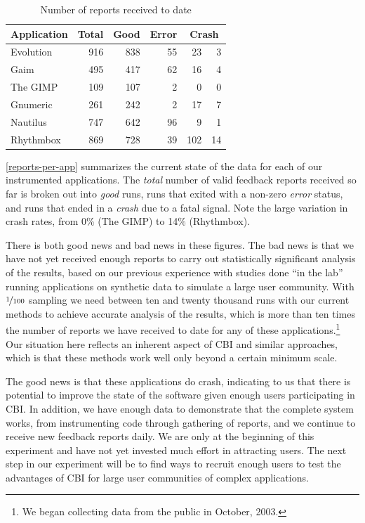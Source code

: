 \documentclass[10pt,twocolumn]{article}
\newcommand{\evolution}{Evolution\xspace}
\newcommand{\gaim}{Gaim\xspace}
\newcommand{\gimp}{The GIMP\xspace}
\newcommand{\gnumeric}{Gnumeric\xspace}
\newcommand{\nautilus}{Nautilus\xspace}
\newcommand{\rhythmbox}{Rhythmbox\xspace}
\newcommand{\header}[1]{\multicolumn{1}{c}{\textbf{#1}}}
\begin{document}
\begin{table}
  \centering
  \begin{tabular}{lrrrr@{~(}r@{\%)}}
    \header{Application} & \header{Total} & \header{Good} & \header{Error} & \multicolumn{2}{c}{\textbf{Crash}} \\ \hline
    \evolution & 916 & 838 & 55 & 23 & 3 \\
    \gaim & 495 & 417 & 62 & 16 & 4 \\
    \gimp & 109 & 107 & 2 & 0 & 0 \\
    \gnumeric & 261 & 242 & 2 & 17 & 7 \\
    \nautilus & 747 & 642 & 96 & 9 & 1 \\
    \rhythmbox & 869 & 728 & 39 & 102 & 14
  \end{tabular}
  \caption{Number of reports received to date}
  \label{reports-per-app}
\end{table}

\autoref{reports-per-app} summarizes the current state of the data for
each of our instrumented applications.  The \emph{total} number of
valid feedback reports received so far is broken out into \emph{good}
runs, runs that exited with a non-zero \emph{error} status, and runs
that ended in a \emph{crash} due to a fatal signal.  Note the large
variation in crash rates, from 0\% (\gimp) to 14\% (\rhythmbox).

There is both good news and bad news in these figures.  The bad news
is that we have not yet received enough reports to carry out
statistically significant analysis of the results, based on our
previous experience with studies done ``in the lab'' running
applications on synthetic data to simulate a large user community.
With $\nicefrac{1}{100}$ sampling we need between ten and twenty
thousand runs with our current methods to achieve accurate analysis of
the results, which is more than ten times the number of reports we
have received to date for any of these applications.\footnote{We began
  collecting data from the public in October, 2003.}  Our situation
here reflects an inherent aspect of CBI and similar approaches, which
is that these methods work well only beyond a certain minimum scale.

The good news is that these applications do crash,
indicating to us that there is potential to improve the state
of the software given enough users participating in CBI\@.  In addition,
we have enough data to demonstrate that the complete system works, from
instrumenting code through gathering of reports, and we continue to
receive new feedback reports daily.  We are only at the beginning of this
experiment and have not yet invested much effort in attracting users. 
The next step in our experiment will be
to find ways to recruit enough users to test the advantages of CBI
for large user communities of complex applications.


\end{document}
